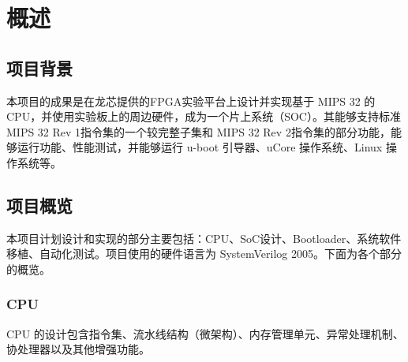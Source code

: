 \chapter{概述}

\section{项目背景}

本项目的成果是在龙芯提供的FPGA实验平台上设计并实现基于 MIPS 32 的CPU，并使用实验板上的周边硬件，成为一个片上系统（SOC）。其能够支持标准MIPS 32 Rev 1指令集的一个较完整子集和 MIPS 32 Rev 2指令集的部分功能，能够运行功能、性能测试，并能够运行 u-boot 引导器、uCore 操作系统、Linux 操作系统等。


\section{项目概览}

本项目计划设计和实现的部分主要包括：CPU、SoC设计、Bootloader、系统软件移植、自动化测试。项目使用的硬件语言为 SystemVerilog 2005。下面为各个部分的概览。

\subsection{CPU}

CPU 的设计包含指令集、流水线结构（微架构）、内存管理单元、异常处理机制、协处理器以及其他增强功能。


